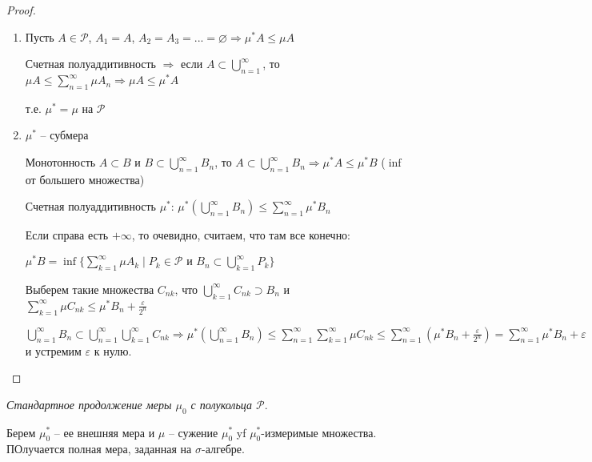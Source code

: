 \begin{proof}
    \begin{enumerate}
        \item Пусть $A\in\mathcal{P}$, $A_1=A$, $A_2=A_3=...=\varnothing\Rightarrow \mu^* A\leq \mu A$
        
        Счетная полуаддитивность $\Rightarrow$ если $A\subset \bigcup\limits_{n=1}^\infty$, 
        то $\mu A \leq \sum \limits_{n=1}^\infty \mu A_n\Rightarrow \mu A \leq \mu^* A$

        т.е. $\mu^* =\mu$ на $\mathcal{P}$

        \item $\mu^*$ – субмера 
        
        Монотонность $A\subset B$ и $B\subset \bigcup\limits_{n=1}^\infty B_n$, то $A\subset \bigcup\limits_{n=1}^\infty B_n\Rightarrow
        \mu^* A \leq \mu^*B$ ($\inf$ от большего множества)
        
        Счетная полуаддитивность $\mu^*$: $\mu^*(\bigcup\limits_{n=1}^\infty B_n)\leq \sum\limits_{n=1}^\infty \mu^* B_n$ 
        
        Если справа есть $+\infty$, то очевидно, считаем, что там все конечно:

        $\mu^* B =\inf \{\sum\limits_{k=1}^\infty \mu A_k\mid P_k\in \mathcal{P}\text{ и } B_n\subset \bigcup\limits_{k=1}^\infty P_k\}$

        Выберем такие множества $C_{nk}$, что $\bigcup\limits_{k=1}^\infty C_{nk}\supset B_n$ и $\sum\limits_{k=1}^\infty \mu C_{nk}\leq \mu^* B_n +\frac{\varepsilon}{2^n}$

        $\bigcup\limits_{n=1}^\infty B_n\subset \bigcup\limits_{n=1}^\infty\bigcup\limits_{k=1}^\infty C_{nk}\Rightarrow 
        \mu^* (\bigcup\limits_{n=1}^\infty B_n)\leq \sum\limits_{n=1}^\infty\sum\limits_{k=1}^\infty \mu C_{nk}\leq
        \sum\limits_{n=1}^\infty (\mu^* B_n + \frac{\varepsilon}{2^n})=\sum\limits_{n=1}^\infty \mu^* B_n + \varepsilon$ и устремим $\varepsilon$ к нулю.
    \end{enumerate}
\end{proof}

\begin{definition}
    \textit{Стандартное продолжение меры $\mu_0$ с полукольца $\mathcal{P}$}.

    Берем $\mu_0^*$ – ее внешняя мера и $\mu$ – сужение $\mu_0^*$ yf $\mu_0^*$-измеримые множества. 
    ПОлучается полная мера, заданная на $\sigma$-алгебре.
\end{definition}

